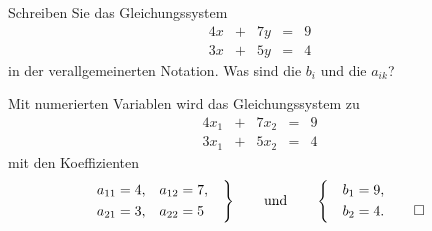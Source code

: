 Schreiben Sie das Gleichungssystem
\begin{equation*}
\renewcommand{\arraycolsep}{3pt}
\begin{array}{rcrcr}
4x &+& 7y &=& 9 \\
3x &+& 5y &=& 4
\end{array}
\end{equation*}
in der verallgemeinerten Notation.
Was sind die $b_i$ und die $a_{ik}$?

\begin{loesung}
Mit numerierten Variablen wird das Gleichungssystem zu
\begin{equation*}
\renewcommand{\arraycolsep}{3pt}
\begin{array}{rcrcr}
4x_1 &+& 7x_2 &=& 9 \\
3x_1 &+& 5x_2 &=& 4
\end{array}
\end{equation*}
mit den Koeffizienten
\begin{equation*}
\raisebox{0.25cm}{$\displaystyle
\left.
\begin{aligned}
a_{11} &= 4, & a_{12} &= 7,\\
a_{21} &= 3, & a_{22} &= 5  \\
\end{aligned}
\quad
\right\}
\qquad\text{und}\qquad
\left\{
\quad
\begin{aligned}
 b_1 &= 9,\\
 b_2 &= 4.
\end{aligned}
\right.$}
\qedhere
\end{equation*}
\end{loesung}

